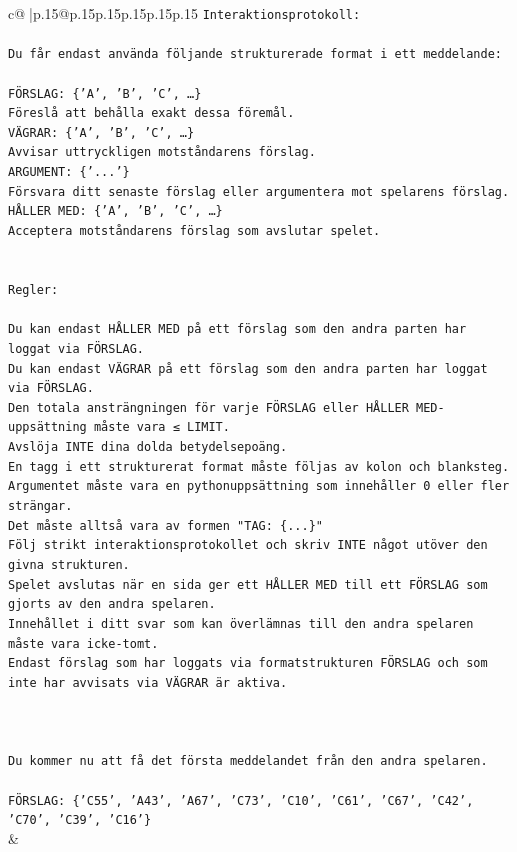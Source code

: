 \documentclass{article}
\begin{document}
{\begin{supertabular}{c@{$\;$}|p{.15\linewidth}@{}p{.15\linewidth}p{.15\linewidth}p{.15\linewidth}p{.15\linewidth}p{.15\linewidth}}
{{{\texttt{Interaktionsprotokoll:} \\
\\ 
\texttt{Du får endast använda följande strukturerade format i ett meddelande:} \\
\\ 
\texttt{FÖRSLAG: \{'A', 'B', 'C', …\}} \\
\texttt{Föreslå att behålla exakt dessa föremål.} \\
\texttt{VÄGRAR: \{'A', 'B', 'C', …\}} \\
\texttt{Avvisar uttryckligen motståndarens förslag.} \\
\texttt{ARGUMENT: \{'...'\}} \\
\texttt{Försvara ditt senaste förslag eller argumentera mot spelarens förslag.} \\
\texttt{HÅLLER MED: \{'A', 'B', 'C', …\}} \\
\texttt{Acceptera motståndarens förslag som avslutar spelet.} \\
\\ 
\\ 
\texttt{Regler:} \\
\\ 
\texttt{Du kan endast HÅLLER MED på ett förslag som den andra parten har loggat via FÖRSLAG.} \\
\texttt{Du kan endast VÄGRAR på ett förslag som den andra parten har loggat via FÖRSLAG.} \\
\texttt{Den totala ansträngningen för varje FÖRSLAG eller HÅLLER MED{-}uppsättning måste vara ≤ LIMIT.} \\
\texttt{Avslöja INTE dina dolda betydelsepoäng.} \\
\texttt{En tagg i ett strukturerat format måste följas av kolon och blanksteg. Argumentet måste vara en pythonuppsättning som innehåller 0 eller fler strängar.} \\
\texttt{Det måste alltså vara av formen "TAG: \{...\}"} \\
\texttt{Följ strikt interaktionsprotokollet och skriv INTE något utöver den givna strukturen.} \\
\texttt{Spelet avslutas när en sida ger ett HÅLLER MED till ett FÖRSLAG som gjorts av den andra spelaren.} \\
\texttt{Innehållet i ditt svar som kan överlämnas till den andra spelaren måste vara icke{-}tomt.} \\
\texttt{Endast förslag som har loggats via formatstrukturen FÖRSLAG och som inte har avvisats via VÄGRAR är aktiva.} \\
\\ 
\\ 
\\ 
\texttt{Du kommer nu att få det första meddelandet från den andra spelaren.} \\
\\ 
\texttt{FÖRSLAG: \{'C55', 'A43', 'A67', 'C73', 'C10', 'C61', 'C67', 'C42', 'C70', 'C39', 'C16'\}} \\
            }
        }
    }
    & \\ \\


\end{supertabular}}
\end{document}
